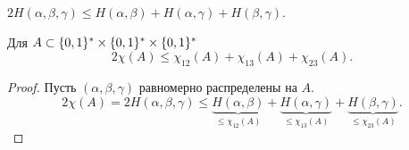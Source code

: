 \documentclass[12pt]{article}
\begin{document}
\begin{statement}
    \(2H(\alpha,\beta,\gamma)\le H(\alpha,\beta) + H(\alpha,\gamma) + H(\beta,\gamma)\).
\end{statement}
\begin{corollary}
Для \(A\subset\{0,1\}^*\times\{0,1\}^*\times\{0,1\}^*\)
\[2\chi(A) \le \chi_{12}(A) + \chi_{13}(A) + \chi_{23}(A).\]
\end{corollary}
\begin{proof}
    Пусть $(\alpha,\beta,\gamma)$ равномерно распределены на $A$.
    \[
        2\chi(A) = 2H(\alpha,\beta,\gamma)\le 
        \underbrace{H(\alpha,\beta) }_{\le\chi_{12}(A)} + 
        \underbrace{H(\alpha,\gamma)}_{\le\chi_{13}(A)} + 
        \underbrace{H(\beta,\gamma) }_{\le\chi_{23}(A)}.
    \]
\end{proof}
\end{document}
